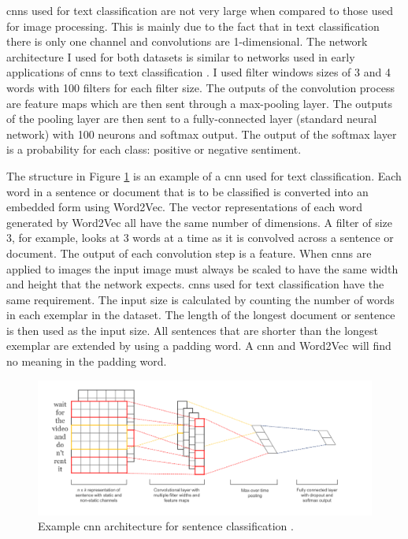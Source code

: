 \documentclass[12pt]{article}
\begin{document}
\ac{cnn}s used for text classification are not very large when compared to those used for image processing. This is mainly due to the fact that in text classification there is only one channel and convolutions are 1-dimensional. The network architecture I used for both datasets is similar to networks used in early applications of \ac{cnn}s to text classification \cite{kim2014convolutional}. I used filter windows sizes of 3 and 4 words with 100 filters for each filter size. The outputs of the convolution process are feature maps which are then sent through a max-pooling layer. The outputs of the pooling layer are then sent to a fully-connected layer (standard neural network) with 100 neurons and softmax output. The output of the softmax layer is a probability for each class: positive or negative sentiment.

The structure in Figure \ref{fig:network_structure} is an example of a \ac{cnn} used for text classification. Each word in a sentence or document that is to be classified is converted into an embedded form using Word2Vec. The vector representations of each word generated by Word2Vec all have the same number of dimensions. A filter of size 3, for example, looks at 3 words at a time as it is convolved across a sentence or document. The output of each convolution step is a feature. When \ac{cnn}s are applied to images the input image must always be scaled to have the same width and height that the network expects. \ac{cnn}s used for text classification have the same requirement. The input size is calculated by counting the number of words in each exemplar in the dataset. The length of the longest document or sentence is then used as the input size. All sentences that are shorter than the longest exemplar are extended by using a padding word. A \ac{cnn} and Word2Vec will find no meaning in the padding word.

\begin{figure}[htbp!]
	\centering
	\includegraphics[scale=.4]{network_structure.png}
	\caption{Example \ac{cnn} architecture for sentence classification \cite{kim2014convolutional}.}
	\label{fig:network_structure}
\end{figure}
\end{document}
